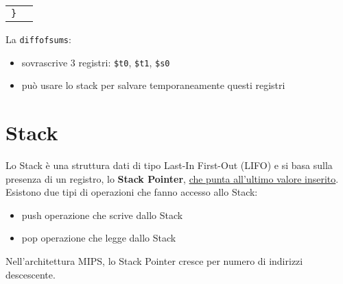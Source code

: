 \documentclass[../main.tex]{subfiles}
\begin{document}
\begin{table}[h!]
\begin{tabular}{ l l }
        \texttt{\}} & \\
    \end{tabular}
\end{table}

\noindent
La \texttt{diffofsums}:
\begin{itemize}
    \item sovrascrive 3 registri: \texttt{\$t0}, \texttt{\$t1}, \texttt{\$s0}
    \item può usare lo stack per salvare
    temporaneamente questi registri
\end{itemize}

\newpage

\section{Stack}
Lo Stack è una struttura dati di tipo Last-In First-Out (LIFO) e
si basa sulla presenza di un registro, lo \textbf{Stack Pointer},
\underline{che punta all'ultimo valore inserito}. \\[2mm]
Esistono due tipi di operazioni che fanno accesso allo Stack:
\begin{itemize}
    \item push operazione che scrive dallo Stack
    \item pop operazione che legge dallo Stack
\end{itemize}

\vspace{2mm}

\noindent
Nell'architettura MIPS, lo Stack Pointer cresce per numero di indirizzi
descescente.
\end{document}
